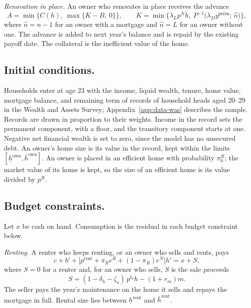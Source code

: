\emph{Renovation in place.} An owner who renovates in place receives the
advance
\begin{equation*}
  A=\min\bigl\{C(h),\ \max\{K-B,\ 0\}\bigr\},
  \qquad
  K=\min\bigl\{\lambda_Lp^Nh,\ P^{-1}\bigl(\lambda_Dy^{\mathrm{perm}};\,\hat n\bigr)\bigr\},
\end{equation*}
where $\hat n=n-1$ for an owner with a mortgage and $\hat n=L$ for an owner
without one. The advance is added to next year's balance and is repaid by
the existing payoff date. The collateral is the inefficient value of the
home.

\subsection{Initial conditions.}\label{app:model-initial}
Households enter at age 23 with the income, liquid wealth, tenure, home
value, mortgage balance, and remaining term of records of household heads
aged 20--29 in the Wealth and Assets Survey; Appendix~\ref{app:data-was}
describes the sample. Records are drawn in proportion to their weights.
Income in the record sets the permanent component, with a floor, and the
transitory component starts at one. Negative net financial wealth is set
to zero, since the model has no unsecured debt. An owner's home size is its
value in the record, kept within the limits $[\underline h^{\mathrm{own}},\bar
h^{\mathrm{own}}]$. An owner is placed in an efficient home with
probability $\pi^R_0$; the market value of its home is kept, so the size
of an efficient home is its value divided by $p^R$.

\subsection{Budget constraints.}\label{app:model-budgets}
Let $x$ be cash on hand. Consumption is the residual in each budget
constraint below.

\emph{Renting.} A renter who keeps renting, or an owner who sells and
rents, pays
\begin{equation*}
  c+b'+\bigl[p^{\mathrm{rent}}+\pi_Re^R+(1-\pi_R)e^N\bigr]h'=x+S,
\end{equation*}
where $S=0$ for a renter and, for an owner who sells, $S$ is the sale
proceeds
\begin{equation*}
  S=(1-\delta_h-\zeta_s)\,p^{t_0}h-(1+r_m)m.
\end{equation*}
The seller pays the year's maintenance on the home it sells and repays the
mortgage in full. Rental size lies between $\underline h^{\mathrm{rent}}$ and
$\bar h^{\mathrm{rent}}$.

